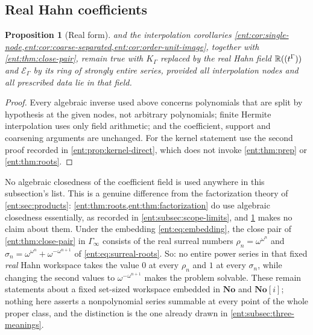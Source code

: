 \documentclass[11pt]{article}
\theoremstyle{plain}
\theoremstyle{plain}
\newtheorem{proposition}[proposition]{Proposition}
\theoremstyle{plain}
\theoremstyle{definition}
\theoremstyle{definition}
\theoremstyle{definition}
\theoremstyle{definition}
\theoremstyle{remark}
\newcommand{\No}{\mathbf{No}}
\newcommand{\K}{K_\Gamma}\newcommand{\KD}{K_\Delta}
\newcommand{\E}{\mathcal E_\Gamma}
\begin{document}
\subsection{Real Hahn coefficients}
\begin{proposition}[Real form]\label{ent:prop:real-form}
 and the
interpolation corollaries
\cref{ent:cor:single-node,ent:cor:coarse-separated,ent:cor:order-unit-image},
together with \cref{ent:thm:close-pair}, remain true with $\K$ replaced by the
real Hahn field $\mathbb R((t^\Gamma))$ and $\E$ by its ring of strongly entire
series, provided all interpolation nodes and all prescribed data lie in that
field.
\end{proposition}
\begin{proof}
Every algebraic inverse used above concerns polynomials that are split by
hypothesis at the given nodes, not arbitrary polynomials; finite Hermite
interpolation uses only field arithmetic; and the coefficient, support and
coarsening arguments are unchanged. For the kernel statement use the second
proof recorded in \cref{ent:prop:kernel-direct}, which does not invoke
\cref{ent:thm:prep} or \cref{ent:thm:roots}.
\end{proof}

No algebraic closedness of the coefficient field is used anywhere in this
subsection's list. This is a genuine difference from the factorization theory
of \cref{ent:sec:products}: \cref{ent:thm:roots,ent:thm:factorization} do use
algebraic closedness essentially, as recorded in
\cref{ent:subsec:scope-limits}, and \cref{ent:prop:real-form} makes no claim
about them. Under the embedding \eqref{ent:eq:embedding}, the close pair of
\cref{ent:thm:close-pair} in $\Gamma_\infty$ consists of the real surreal
numbers $\rho_n=\omega^{\omega^n}$ and
$\sigma_n=\omega^{\omega^n}+\omega^{-\omega^{n+1}}$ of
\eqref{ent:eq:surreal-roots}. So: no entire power series in that fixed
\emph{real} Hahn workspace takes the value $0$ at every $\rho_n$ and $1$ at
every $\sigma_n$, while changing the second values to $\omega^{-\omega^{n+1}}$
makes the problem solvable. These remain statements about a fixed set-sized
workspace embedded in $\No$ and $\No[i]$; nothing here asserts a nonpolynomial
series summable at every point of the whole proper class, and the
distinction is the one already drawn in \cref{ent:subsec:three-meanings}.
\end{document}
